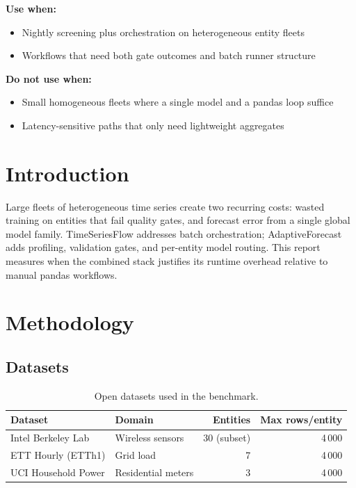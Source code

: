 \documentclass[11pt,a4paper]{article}
\begin{document}
\textbf{Use when:}
\begin{itemize}
  \item Nightly screening plus orchestration on heterogeneous entity fleets
  \item Workflows that need both gate outcomes and batch runner structure
\end{itemize}

\textbf{Do not use when:}
\begin{itemize}
  \item Small homogeneous fleets where a single model and a pandas loop suffice
  \item Latency-sensitive paths that only need lightweight aggregates
\end{itemize}



\section{Introduction}
Large fleets of heterogeneous time series create two recurring costs: wasted training on entities that fail quality gates,
and forecast error from a single global model family. TimeSeriesFlow addresses batch orchestration; AdaptiveForecast adds
profiling, validation gates, and per-entity model routing. This report measures when the combined stack justifies its
runtime overhead relative to manual pandas workflows.

\section{Methodology}
\subsection{Datasets}
\begin{table}[htbp]
\centering
\caption{Open datasets used in the benchmark.}
\begin{tabular}{llrr}
\toprule
Dataset & Domain & Entities & Max rows/entity \\
\midrule
Intel Berkeley Lab & Wireless sensors & 30 (subset) & 4\,000 \\
ETT Hourly (ETTh1) & Grid load & 7 & 4\,000 \\
UCI Household Power & Residential meters & 3 & 4\,000 \\
\bottomrule
\end{tabular}
\end{table}
\end{document}
